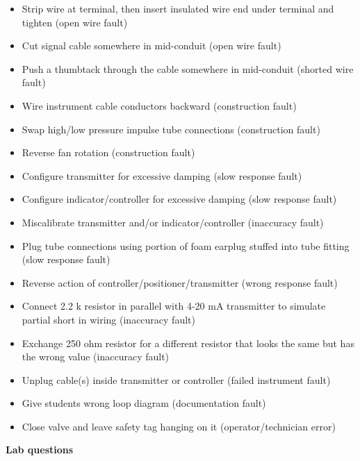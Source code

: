 \begin{itemize}
\item{} Strip wire at terminal, then insert insulated wire end under terminal and tighten (open wire fault)
\item{} Cut signal cable somewhere in mid-conduit (open wire fault)
\item{} Push a thumbtack through the cable somewhere in mid-conduit (shorted wire fault)
\item{} Wire instrument cable conductors backward (construction fault)
\item{} Swap high/low pressure impulse tube connections (construction fault)
\item{} Reverse fan rotation (construction fault)
\item{} Configure transmitter for excessive damping (slow response fault)
\item{} Configure indicator/controller for excessive damping (slow response fault)
\item{} Miscalibrate transmitter and/or indicator/controller (inaccuracy fault)
\item{} Plug tube connections using portion of foam earplug stuffed into tube fitting (slow response fault)
\item{} Reverse action of controller/positioner/transmitter (wrong response fault)
\item{} Connect 2.2 k resistor in parallel with 4-20 mA transmitter to simulate partial short in wiring (inaccuracy fault)
\item{} Exchange 250 ohm resistor for a different resistor that looks the same but has the wrong value (inaccuracy fault) 
\item{} Unplug cable(s) inside transmitter or controller (failed instrument fault)
\item{} Give students wrong loop diagram (documentation fault)
\item{} Close valve and leave safety tag hanging on it (operator/technician error)
\end{itemize}


















\vfil \eject

\noindent
{\bf Lab questions}

